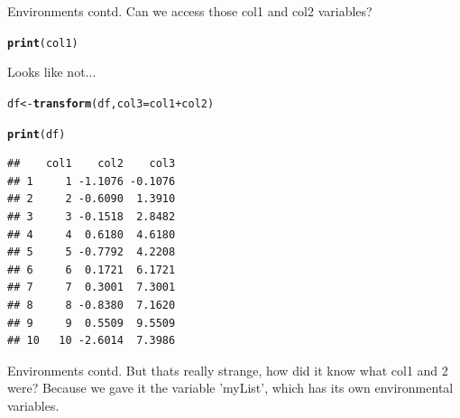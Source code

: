 \documentclass{beamer}\usepackage[]{graphicx}\usepackage[]{color}
\makeatletter
\newcommand{\hlopt}[1]{\textcolor[rgb]{0,0,0}{#1}}%
\newcommand{\hlstd}[1]{\textcolor[rgb]{0.345,0.345,0.345}{#1}}%
\newcommand{\hlkwb}[1]{\textcolor[rgb]{0.69,0.353,0.396}{#1}}%
\newcommand{\hlkwc}[1]{\textcolor[rgb]{0.333,0.667,0.333}{#1}}%
\newcommand{\hlkwd}[1]{\textcolor[rgb]{0.737,0.353,0.396}{\textbf{#1}}}%
\newenvironment{kframe}{%
 \def\at@end@of@kframe{}%
 \ifinner\ifhmode%
  \def\at@end@of@kframe{\end{minipage}}%
  \begin{minipage}{\columnwidth}%
 \fi\fi%
 \def\FrameCommand##1{\hskip\@totalleftmargin \hskip-\fboxsep
 \colorbox{shadecolor}{##1}\hskip-\fboxsep
     \hskip-\linewidth \hskip-\@totalleftmargin \hskip\columnwidth}%
 \MakeFramed {\advance\hsize-\width
   \@totalleftmargin\z@ \linewidth\hsize
   \@setminipage}}%
 {\par\unskip\endMakeFramed%
 \at@end@of@kframe}
\newenvironment{knitrout}{}{} %
\makeatother
\begin{document}
\begin{frame}[fragile]{Environments contd.}
Can we access those col1 and col2 variables?
\begin{knitrout}
\color{fgcolor}\begin{kframe}
\begin{alltt}
\hlkwd{print}\hlstd{(col1)}
\end{alltt}


{\ttfamily\noindent\bfseries\color{errorcolor}{\#\# Error: object 'col1' not found}}\end{kframe}
\end{knitrout}

Looks like not... 
\begin{knitrout}
\color{fgcolor}\begin{kframe}
\begin{alltt}
\hlstd{df} \hlkwb{<-} \hlkwd{transform}\hlstd{(df,} \hlkwc{col3} \hlstd{= col1} \hlopt{+} \hlstd{col2)}

\hlkwd{print}\hlstd{(df)}
\end{alltt}
\begin{verbatim}
##    col1    col2    col3
## 1     1 -1.1076 -0.1076
## 2     2 -0.6090  1.3910
## 3     3 -0.1518  2.8482
## 4     4  0.6180  4.6180
## 5     5 -0.7792  4.2208
## 6     6  0.1721  6.1721
## 7     7  0.3001  7.3001
## 8     8 -0.8380  7.1620
## 9     9  0.5509  9.5509
## 10   10 -2.6014  7.3986
\end{verbatim}
\end{kframe}
\end{knitrout}

\end{frame}

\begin{frame}[fragile]{Environments contd.}
But thats really strange, how did it know what col1 and 2 were?
\linebreak
\linebreak
\pause
Because we gave it the variable 'myList', which has its own environmental variables.
\end{frame}
\end{document}
